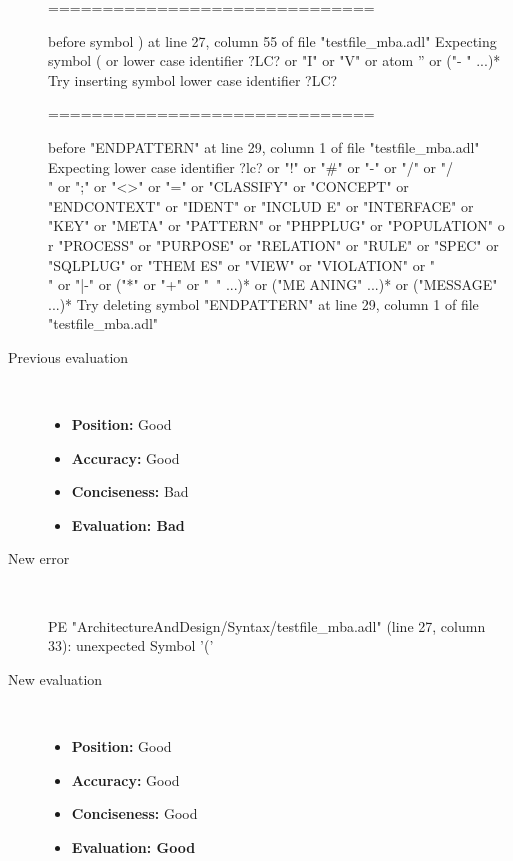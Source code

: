 \begin{description}
\begin{haskell}
==============================

before symbol ) at line 27, column 55 of file "testfile_mba.adl"
Expecting symbol ( or lower case identifier ?LC? or "I" or "V" or atom '' or ("-
" ...)*
Try inserting symbol lower case identifier ?LC?

==============================

before "ENDPATTERN" at line 29, column 1 of file "testfile_mba.adl"
Expecting lower case identifier ?lc? or "!" or "#" or "-" or "/" or "/\\" or ";"
 or "<>" or "=" or "CLASSIFY" or "CONCEPT" or "ENDCONTEXT" or "IDENT" or "INCLUD
E" or "INTERFACE" or "KEY" or "META" or "PATTERN" or "PHPPLUG" or "POPULATION" o
r "PROCESS" or "PURPOSE" or "RELATION" or "RULE" or "SPEC" or "SQLPLUG" or "THEM
ES" or "VIEW" or "VIOLATION" or "\\" or "|-" or ("*" or "+" or "~" ...)* or ("ME
ANING" ...)* or ("MESSAGE" ...)*
Try deleting symbol "ENDPATTERN" at line 29, column 1 of file "testfile_mba.adl"
\end{haskell}
  \item[Previous evaluation]~\\
    \begin{itemize}
    \item \textbf{Position:} Good
    \item \textbf{Accuracy:} Good
    \item \textbf{Conciseness:} Bad
    \item \textbf{Evaluation: Bad}
    \end{itemize}
  \item[New error]~\\
\begin{haskell}
PE "ArchitectureAndDesign/Syntax/testfile_mba.adl" (line 27, column 33):
unexpected Symbol '('\end{haskell}
  \item[New evaluation]~\\
    \begin{itemize}
    \item \textbf{Position:} Good
    \item \textbf{Accuracy:} Good
    \item \textbf{Conciseness:} Good
    \item \textbf{Evaluation: Good}
    \end{itemize}
  \end{description}

\hrulefill

